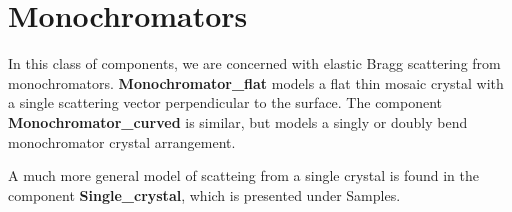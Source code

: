 
\chapter{Monochromators}

In this class of components, we are concerned with elastic Bragg
scattering from monochromators. {\bf Monochromator\_flat} 
models a flat thin mosaic crystal with a single scattering vector
perpendicular to the surface.  
The component {\bf Monochromator\_curved} is similar, 
but models a singly or doubly bend monochromator crystal arrangement.

A much more general model of scatteing from a single crystal is 
found in the component {\bf Single\_crystal},
which is presented under Samples.


\newpage


